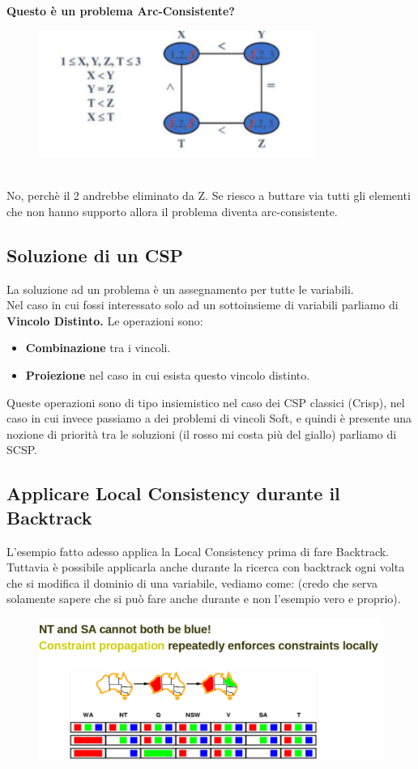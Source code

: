 \vspace{0.8cm}

\textbf{Questo è un problema Arc-Consistente?}
\begin{figure}[htp]
	\centering
    \includegraphics[width=9cm, keepaspectratio]{img/Cap3/riassunto2.png}
\end{figure}
\\No, perchè il 2 andrebbe eliminato da Z. Se riesco a buttare via tutti gli elementi che non hanno supporto allora il problema diventa arc-consistente.

\subsection{Soluzione di un CSP}
La soluzione ad un problema è un assegnamento per tutte le variabili.
\\Nel caso in cui fossi interessato solo ad un sottoinsieme di variabili parliamo di \textbf{Vincolo Distinto.}
Le operazioni sono:
\begin{itemize}
    \item  \textbf{Combinazione} tra i vincoli.
    \item \textbf{Proiezione} nel caso in cui esista questo vincolo distinto.
\end{itemize}
Queste operazioni sono di tipo insiemistico nel caso dei CSP classici (Crisp), nel caso in cui invece passiamo a dei problemi di vincoli Soft, e quindi è presente una nozione di priorità tra le soluzioni (il rosso mi costa più del giallo) parliamo di SCSP.

\subsection{Applicare Local Consistency durante il Backtrack}
L’esempio fatto adesso applica la Local Consistency prima di fare Backtrack. Tuttavia è possibile applicarla anche durante la ricerca con backtrack ogni volta che si modifica il dominio di una variabile, vediamo come: (credo che serva solamente sapere che si può fare anche durante e non l’esempio vero e proprio).
\begin{figure}[htp]
	\centering
    \includegraphics[width=12cm, keepaspectratio]{latex/img/Cap3/prova3.png}
\end{figure}

